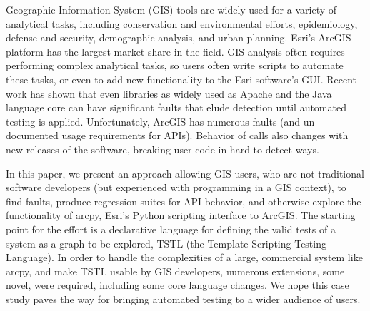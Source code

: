 Geographic Information System (GIS) tools are widely used for a variety of
analytical tasks, including conservation and environmental efforts,
epidemiology, defense and security, demographic analysis, and urban
planning.  Esri's ArcGIS platform has the largest market share in the
field.  GIS analysis often requires performing complex analytical
tasks, so users often write scripts to automate these tasks, or even
to add new functionality to the Esri software's GUI.  Recent work
has shown that even libraries as widely used as Apache and the Java
language core can have significant faults that elude detection until
automated testing is applied.  Unfortunately,  
ArcGIS has numerous faults (and un-documented usage requirements for
APIs).  Behavior of calls also changes with new releases of the
software, breaking user code in hard-to-detect ways.

In this paper, we present an approach allowing GIS users, who are not
traditional software developers (but experienced with programming in a
GIS context), to find faults, produce regression suites for API
behavior, and otherwise explore the functionality of arcpy, Esri's
Python scripting interface to ArcGIS.  The starting point for the
effort is a declarative language for defining the valid tests of a
system as a graph to be explored, TSTL (the Template Scripting Testing
Language).  In order to handle the complexities of a large, commercial
system like arcpy, and make TSTL usable by GIS developers, numerous
extensions, some novel, were required, including some core language
changes.  We hope this case study paves the way for bringing automated
testing to a wider audience of users.
